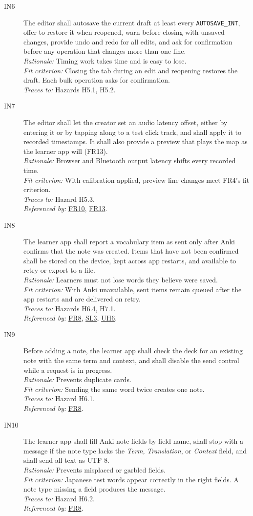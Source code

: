 \documentclass[12pt]{article}
\newcommand{\cn}[1]{\texttt{#1}}
\newcommand{\rat}[1]{\\\textit{Rationale:} #1}
\newcommand{\fit}[1]{\\\textit{Fit criterion:} #1}
\newcommand{\trace}[1]{\\\textit{Traces to:} #1}
\newcommand{\usedby}[1]{\\\textit{Referenced by:} #1}
\newcommand{\reqdef}[1]{\hypertarget{req:#1}{#1}}
\newcommand{\req}[1]{\hyperlink{req:#1}{#1}}
\begin{document}
\begin{description}
\item[\reqdef{IN6}] The editor shall autosave the current draft at least every
\cn{AUTOSAVE\_INT}, offer to restore it when reopened, warn before closing with
unsaved changes, provide undo and redo for all edits, and ask for confirmation
before any operation that changes more than one line.
\rat{Timing work takes time and is easy to lose.}
\fit{Closing the tab during an edit and reopening restores the draft. Each
bulk operation asks for confirmation.}
\trace{Hazards H5.1, H5.2.}

\item[\reqdef{IN7}] The editor shall let the creator set an audio latency offset,
either by entering it or by tapping along to a test click track, and shall
apply it to recorded timestamps. It shall also provide a preview that plays
the map as the learner app will (FR13).
\rat{Browser and Bluetooth output latency shifts every recorded time.}
\fit{With calibration applied, preview line changes meet FR4's fit criterion.}
\trace{Hazard H5.3.}
\usedby{\req{FR10}, \req{FR13}.}

\item[\reqdef{IN8}] The learner app shall report a vocabulary item as sent only after
Anki confirms that the note was created. Items that have not been confirmed
shall be stored on the device, kept across app restarts, and available to retry
or export to a file.
\rat{Learners must not lose words they believe were saved.}
\fit{With Anki unavailable, sent items remain queued after the app restarts and
are delivered on retry.}
\trace{Hazards H6.4, H7.1.}
\usedby{\req{FR8}, \req{SL3}, \req{UH6}.}

\item[\reqdef{IN9}] Before adding a note, the learner app shall check the \progname{}
deck for an existing note with the same term and context, and shall disable the
send control while a request is in progress.
\rat{Prevents duplicate cards.}
\fit{Sending the same word twice creates one note.}
\trace{Hazard H6.1.}
\usedby{\req{FR8}.}

\item[\reqdef{IN10}] The learner app shall fill Anki note fields by field name, shall
stop with a message if the note type lacks the \emph{Term},
\emph{Translation}, or \emph{Context} field, and shall send all text as UTF-8.
\rat{Prevents misplaced or garbled fields.}
\fit{Japanese test words appear correctly in the right fields. A note type
missing a field produces the message.}
\trace{Hazard H6.2.}
\usedby{\req{FR8}.}


\end{description}
\end{document}
